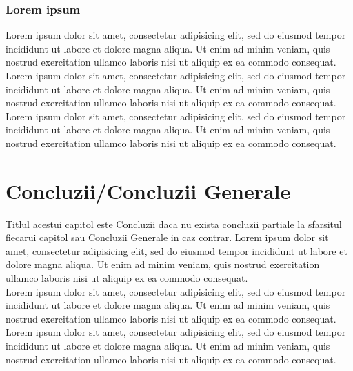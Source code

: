 \documentclass[12pt,openright,twoside]{book}
\renewcommand{\contentsname}{{\Huge Table of Contents}}
\begin{document}
\subsection{Lorem ipsum }

Lorem ipsum dolor sit amet, consectetur adipisicing elit, sed do eiusmod tempor incididunt ut labore et dolore magna aliqua. Ut enim ad minim veniam, quis nostrud exercitation ullamco laboris nisi ut aliquip ex ea commodo consequat.\\

Lorem ipsum dolor sit amet, consectetur adipisicing elit, sed do eiusmod tempor incididunt ut labore et dolore magna aliqua. Ut enim ad minim veniam, quis nostrud exercitation ullamco laboris nisi ut aliquip ex ea commodo consequat.\\

Lorem ipsum dolor sit amet, consectetur adipisicing elit, sed do eiusmod tempor incididunt ut labore et dolore magna aliqua. Ut enim ad minim veniam, quis nostrud exercitation ullamco laboris nisi ut aliquip ex ea commodo consequat.\\


\chapter{Concluzii/Concluzii Generale}

Titlul acestui capitol este Concluzii daca nu exista concluzii partiale la sfarsitul fiecarui capitol sau Concluzii Generale in caz contrar. Lorem ipsum dolor sit amet, consectetur adipisicing elit, sed do eiusmod tempor incididunt ut labore et dolore magna aliqua. Ut enim ad minim veniam, quis nostrud exercitation ullamco laboris nisi ut aliquip ex ea commodo consequat.\\

Lorem ipsum dolor sit amet, consectetur adipisicing elit, sed do eiusmod tempor incididunt ut labore et dolore magna aliqua. Ut enim ad minim veniam, quis nostrud exercitation ullamco laboris nisi ut aliquip ex ea commodo consequat.\\

Lorem ipsum dolor sit amet, consectetur adipisicing elit, sed do eiusmod tempor incididunt ut labore et dolore magna aliqua. Ut enim ad minim veniam, quis nostrud exercitation ullamco laboris nisi ut aliquip ex ea commodo consequat.\\







\renewcommand{\contentsname}{References}
\renewcommand\bibname{References} %

%
%


\end{document}
